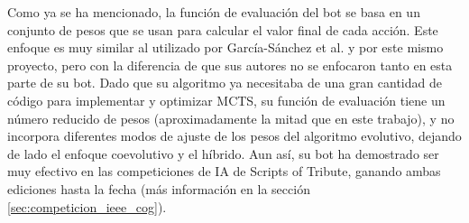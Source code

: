 Como ya se ha mencionado, la función de evaluación del bot se basa en un conjunto de pesos que se usan para calcular el valor final de cada acción. Este enfoque es muy similar al utilizado por García-Sánchez et al. y por este mismo proyecto, pero con la diferencia de que sus autores no se enfocaron tanto en esta parte de su bot. Dado que su algoritmo ya necesitaba de una gran cantidad de código para implementar y optimizar MCTS, su función de evaluación tiene un número reducido de pesos (aproximadamente la mitad que en este trabajo), y no incorpora diferentes modos de ajuste de los pesos del algoritmo evolutivo, dejando de lado el enfoque coevolutivo y el híbrido. Aun así, su bot ha demostrado ser muy efectivo en las competiciones de IA de Scripts of Tribute, ganando ambas ediciones hasta la fecha (más información en la sección \ref{sec:competicion_ieee_cog}).

